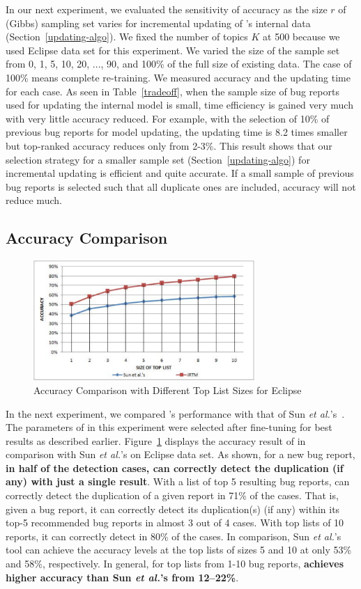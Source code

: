 In our next experiment, we evaluated the sensitivity of accuracy as
the size $r$ of (Gibbs) sampling set varies for incremental updating
of {\model}'s internal data (Section~\ref{updating-algo}). We fixed
the number of topics $K$ at 500 because we used Eclipse data set for
this experiment. We varied the size of the sample set from 0, 1, 5,
10, 20, ..., 90, and 100\% of the full size of existing data. The case
of 100\% means complete re-training. We measured accuracy and the
updating time for each case. As seen in Table~\ref{tradeoff}, when the
sample size of bug reports used for updating the internal model is
small, time efficiency is gained very much with very little accuracy
reduced. For example, with the selection of 10\% of previous bug
reports for model updating, the updating time is 8.2 times smaller but
top-ranked accuracy reduces only from 2-3\%. This result shows that
our selection strategy for a smaller sample set
(Section~\ref{updating-algo}) for incremental updating is efficient
and quite accurate. If a small sample of previous bug reports is
selected such that all duplicate ones are included, accuracy will not
reduce much.


\subsection{Accuracy Comparison}

\begin{figure}[t]
\centering
\includegraphics[width=3.3in]{eclipse3}
\caption{Accuracy Comparison with Different Top List Sizes for Eclipse}
\label{eclipse}
\end{figure}


In the next experiment, we compared {\model}'s performance with that
of Sun {\em et al.}'s~\cite{davidlo10}. The parameters of {\model} in
this experiment were selected after fine-tuning for best results as
described earlier. Figure~\ref{eclipse} displays the accuracy result
of {\model} in comparison with Sun {\em et al.}'s on Eclipse data
set. As shown, for a new bug report, {\bf in half of the detection cases,
{\model} can correctly detect the duplication (if any) with just a
single result}. With a list of top 5 resulting bug reports, {\model}
can correctly detect the duplication of a given report in 71\% of the
cases. That is, given a bug report, it can correctly detect its
duplication(s) (if any) within its top-5 recommended bug reports in
almost 3 out of 4 cases. With top lists of 10 reports, it can correctly
detect in 80\% of the cases. In comparison, Sun {\em et al.}'s tool
can achieve the accuracy levels at the top lists of sizes 5 and 10 at
only 53\% and 58\%, respectively. In general, for top lists from 1-10
bug reports, {\bf {\model} achieves higher accuracy than Sun {\em et al.}'s
from 12--22\%}.

